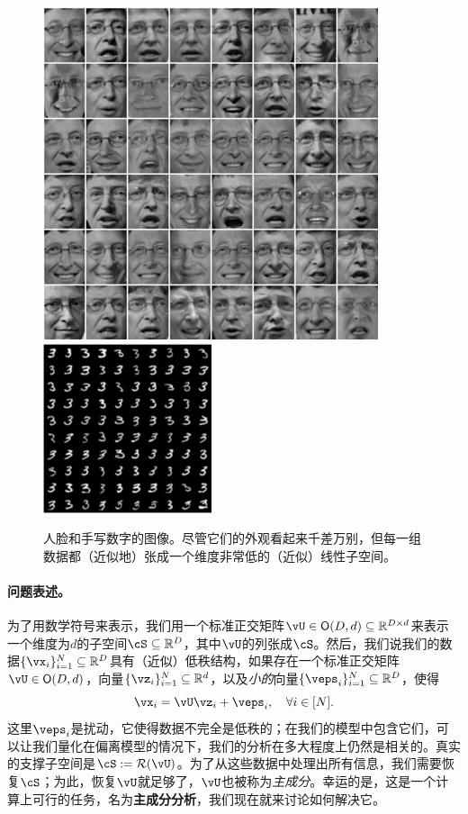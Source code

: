 \documentclass[../../book-main.tex]{subfiles}
\begin{document}
\begin{figure}
    \centering
    \includegraphics[width=0.4\linewidth]{figs_chap2/faces.png}
    \hspace{5mm} \includegraphics[width=0.395\linewidth]{figs_chap2/handwritten-digits.png}   
    \caption{人脸和手写数字的图像。尽管它们的外观看起来千差万别，但每一组数据都（近似地）张成一个维度非常低的（近似）线性子空间。}
    \label{fig:faces-digits}
\end{figure}

\paragraph{问题表述。}
为了用数学符号来表示，我们用一个标准正交矩阵\(\vU \in \O(D, d) \subseteq \R^{D \times d}\)来表示一个维度为\(d\)的子空间\(\cS \subseteq \R^{D}\)，其中\(\vU\)的列张成\(\cS\)。然后，我们说我们的数据\(\{\vx_{i}\}_{i = 1}^{N} \subseteq \R^{D}\)具有（近似）低秩结构，如果存在一个标准正交矩阵\(\vU \in \O(D, d)\)，向量\(\{\vz_{i}\}_{i = 1}^{N} \subseteq \R^{d}\)，以及\textit{小的}向量\(\{\veps_{i}\}_{i = 1}^{N} \subseteq \R^{D}\)，使得
\begin{equation}\label{eq:pca_dgp}
    \vx_{i} = \vU\vz_{i} + \veps_{i}, \quad \forall i \in [N].
\end{equation}
这里\(\veps_{i}\)是扰动，它使得数据不完全是低秩的；在我们的模型中包含它们，可以让我们量化在偏离模型的情况下，我们的分析在多大程度上仍然是相关的。真实的支撑子空间是\(\cS := \Range(\vU)\)。为了从这些数据中处理出所有信息，我们需要恢复\(\cS\)；为此，恢复\(\vU\)就足够了，\(\vU\)也被称为\textit{主成分}。幸运的是，这是一个计算上可行的任务，名为{\bf 主成分分析}，我们现在就来讨论如何解决它。
\end{document}
